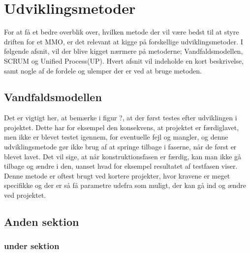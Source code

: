 \chapter{Udviklingsmetoder}
For at få et bedre overblik over, hvilken metode der vil være bedst til at styre driften for et MMO, er det relevant at kigge på forskellige udviklingsmetoder. I følgende afsnit, vil der blive kigget nærmere på metoderne; Vandfaldsmodellen, SCRUM og Unified Process(UP). Hvert afsnit vil indeholde en kort beskrivelse, samt nogle af de fordele og ulemper der er ved at bruge metoden.\\

\section{Vandfaldsmodellen}
Det er vigtigt her, at bemærke i figur ?, at der først testes efter udviklingen i projektet. 
Dette har for eksempel den konsekvens, at projektet er færdiglavet, men ikke er blevet testet igennem, for eventuelle fejl og mangler, og denne udviklingsmetode gør ikke brug af at springe tilbage i faserne, når de først er blevet lavet. 
Det vil sige, at når konstruktionsfasen er færdig, kan man ikke gå tilbage og ændre i den, uanset hvad for eksempel resultatet af testfasen viser. 
Denne metode er oftest brugt ved kortere projekter, hvor kravene er meget specifikke og der er så få parametre udefra som muligt, der kan gå ind og ændre ved projektet.\\
\section{Anden sektion}

\subsection{under sektion}
